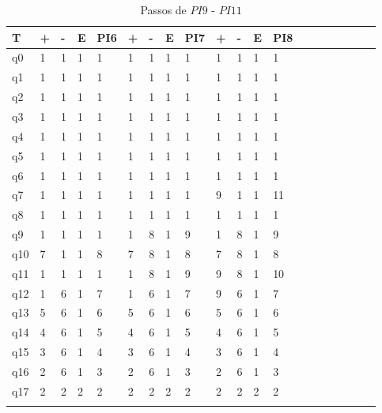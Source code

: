 \documentclass[12pt,a4paper]{report}
\begin{document}
\begin{table}[ht]
\caption{\label{tab:table-name} Passos de $PI9$ - $PI11$}
\centering
\begin{tabular}{ l l l l l l l l l l l l l l l l l l l l }
\hline
\hline
T      & + & - & E & PI6 & + & - & E & PI7 & + & - & E & PI8 &  &  &  &  &  &  &  \\ \hline
q0  & 1 & 1 & 1 & 1   & 1 & 1 & 1 & 1   & 1 & 1 & 1 & 1   &  &  &  &  &  &  &  \\
q1  & 1 & 1 & 1 & 1   & 1 & 1 & 1 & 1   & 1 & 1 & 1 & 1   &  &  &  &  &  &  &  \\
q2  & 1 & 1 & 1 & 1   & 1 & 1 & 1 & 1   & 1 & 1 & 1 & 1   &  &  &  &  &  &  &  \\
q3  & 1 & 1 & 1 & 1   & 1 & 1 & 1 & 1   & 1 & 1 & 1 & 1   &  &  &  &  &  &  &  \\
q4  & 1 & 1 & 1 & 1   & 1 & 1 & 1 & 1   & 1 & 1 & 1 & 1   &  &  &  &  &  &  &  \\
q5  & 1 & 1 & 1 & 1   & 1 & 1 & 1 & 1   & 1 & 1 & 1 & 1   &  &  &  &  &  &  &  \\
q6  & 1 & 1 & 1 & 1   & 1 & 1 & 1 & 1   & 1 & 1 & 1 & 1   &  &  &  &  &  &  &  \\
q7  & 1 & 1 & 1 & 1   & 1 & 1 & 1 & 1   & 9 & 1 & 1 & 11  &  &  &  &  &  &  &  \\
q8  & 1 & 1 & 1 & 1   & 1 & 1 & 1 & 1   & 1 & 1 & 1 & 1   &  &  &  &  &  &  &  \\
q9  & 1 & 1 & 1 & 1   & 1 & 8 & 1 & 9   & 1 & 8 & 1 & 9   &  &  &  &  &  &  &  \\
q10 & 7 & 1 & 1 & 8   & 7 & 8 & 1 & 8   & 7 & 8 & 1 & 8   &  &  &  &  &  &  &  \\
q11 & 1 & 1 & 1 & 1   & 1 & 8 & 1 & 9   & 9 & 8 & 1 & 10  &  &  &  &  &  &  &  \\
q12 & 1 & 6 & 1 & 7   & 1 & 6 & 1 & 7   & 9 & 6 & 1 & 7   &  &  &  &  &  &  &  \\
q13 & 5 & 6 & 1 & 6   & 5 & 6 & 1 & 6   & 5 & 6 & 1 & 6   &  &  &  &  &  &  &  \\
q14 & 4 & 6 & 1 & 5   & 4 & 6 & 1 & 5   & 4 & 6 & 1 & 5   &  &  &  &  &  &  &  \\
q15 & 3 & 6 & 1 & 4   & 3 & 6 & 1 & 4   & 3 & 6 & 1 & 4   &  &  &  &  &  &  &  \\
q16 & 2 & 6 & 1 & 3   & 2 & 6 & 1 & 3   & 2 & 6 & 1 & 3   &  &  &  &  &  &  &  \\
q17 & 2 & 2 & 2 & 2   & 2 & 2 & 2 & 2   & 2 & 2 & 2 & 2   &  &  &  &  &  &  &  \\
       &   &   &   &     &   &   &   &     &   &   &   &     &  &  &  &  &  &  &  \\
       \hline
\end{tabular}
\end{table}
\end{document}
